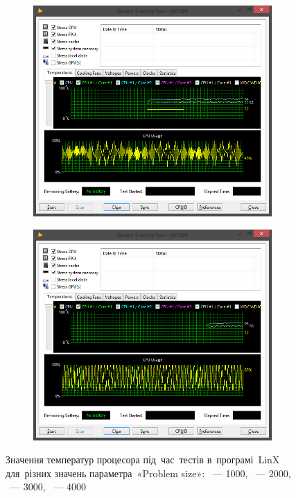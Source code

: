\documentclass[
	a4paper,
	oneside,
	BCOR = 10mm,
	DIV = 12,
	12pt,
	headings = normal,
]{scrartcl}
\begin{document}
\begin{figure}[!htbp]
\begin{subfigure}[t]{\columnwidth / 2}
					\caption{}
					\label{subfig:aida64-res-ps2000}
				\end{subfigure}
				\begin{subfigure}[t]{\columnwidth / 2}
					\includegraphics[height = 12\baselineskip]{./assets/y03s02-pcdiag-lab-03-p06-aida-res-ps3000.png}
					\caption{}
					\label{subfig:aida64-res-ps3000}
				\end{subfigure}%
				\begin{subfigure}[t]{\columnwidth / 2}
					\includegraphics[height = 12\baselineskip]{./assets/y03s02-pcdiag-lab-03-p07-aida-res-ps4000.png}
					\caption{}
					\label{subfig:aida64-res-ps4000}
				\end{subfigure}%
				\caption{Значення температур процесора під~час~тестів в~програмі~\textenglish{LinX} для~різних значень параметра~«\textenglish{Problem size}»: ~— 1000, ~— 2000, ~— 3000, ~— 4000}
				\label{fig:aida64-res}
			\end{figure}
\end{document}
